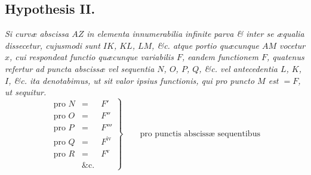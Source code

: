\subsection*{Hypothesis II.}
\textit{Si curvæ abscissa $AZ$ in elementa innumerabilia infinite parva \& inter se æqualia dissecetur, cujusmodi sunt $IK$, $KL$, $LM$, \&c. atque portio quæcunque $AM$ vocetur $x$, cui respondeat functio quæcunque variabilis $F$, eandem functionem $F$, quatenus refertur ad puncta abscissæ vel sequentia $N$, $O$, $P$, $Q$, \&c. vel antecedentia $L$, $K$, $I$, \&c. ita denotabimus, ut sit valor ipsius functionis, qui pro puncto $M$ est $=F$, ut sequitur.
\[
\left.\begin{array}{rcl}
\text{pro }N&=&F'\\
\text{pro }O&=&F''\\
\text{pro }P&=&F'''\\
\text{pro }Q&=&F^{\mathrm{iv}}\\
\text{pro }R&=&F^{\mathrm{v}}\\
&\text{\&c.}
\end{array}\right\}
\qquad\text{pro punctis abscissæ sequentibus}
\]}

